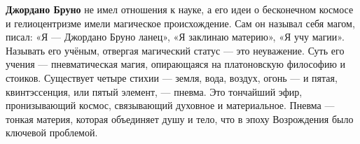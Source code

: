
\textbf{Джордано Бруно} не имел отношения к науке, а его идеи о бесконечном космосе и гелиоцентризме имели магическое происхождение. Сам он называл себя магом, писал: «Я --- Джордано Бруно ланец», «Я заклинаю материю», «Я учу магии». Называть его учёным, отвергая магический статус --- это неуважение. 
Суть его учения --- пневматическая магия, опирающаяся на платоновскую философию и стоиков. Существует четыре стихии --- земля, вода, воздух, огонь --- и пятая, квинтэссенция, или пятый элемент, --- пневма. Это тончайший эфир, пронизывающий космос, связывающий духовное и материальное. Пневма --- тонкая материя, которая объединяет душу и тело, что в эпоху Возрождения было ключевой проблемой.

